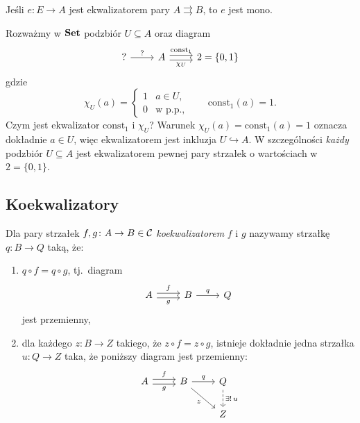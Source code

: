 \begin{stwierdzenie}
Jeśli $e\colon E\to A$ jest ekwalizatorem pary $A\rightrightarrows B$, to $e$ jest mono.
\end{stwierdzenie}

\begin{przyklad}
Rozważmy w $\mathbf{Set}$ podzbiór $U\subseteq A$ oraz diagram
\[\begin{tikzcd}
? \arrow[r,"?"] & A \arrow[r,shift left,"\mathrm{const}_1"] \arrow[r,shift right,swap,"\chi_U"] & 2=\{0,1\}
\end{tikzcd}\]
gdzie
\[
\chi_U(a)=\begin{cases} 1 & a\in U,\\ 0 & \text{w p.p.},\end{cases} \qquad \mathrm{const}_1(a)=1.
\]
Czym jest ekwalizator $\mathrm{const}_1$ i $\chi_U$? Warunek $\chi_U(a) = \mathrm{const}_1(a) = 1$ oznacza dokładnie $a\in U$, więc ekwalizatorem jest inkluzja $U \hookrightarrow A$. W szczególności \emph{każdy} podzbiór $U\subseteq A$ jest ekwalizatorem pewnej pary strzałek o wartościach w $2=\{0,1\}$.
\end{przyklad}

\subsection*{Koekwalizatory}

\begin{definicja}
Dla pary strzałek $f, g \colon A\to B \in \mathcal{C}$ \emph{koekwalizatorem} $f$ i $g$ nazywamy strzałkę $q\colon B\to Q$ taką, że:
\begin{enumerate}
\item $q\circ f = q\circ g$, tj.\ diagram
\[\begin{tikzcd}
A \arrow[r,shift left,"f"] \arrow[r,shift right,swap,"g"] & B \arrow[r,"q"] & Q
\end{tikzcd}\]
jest przemienny,
\item dla każdego $z\colon B\to Z$ takiego, że $z\circ f = z\circ g$, istnieje dokładnie jedna strzałka $u\colon Q\to Z$ taka, że poniższy diagram jest przemienny:
\[\begin{tikzcd}
A \arrow[r,shift left,"f"] \arrow[r,shift right,swap,"g"] & B \arrow[r,"q"] \arrow[dr,swap,"z"] & Q \arrow[d,dashed,"\exists !\, u"] \\
& & Z
\end{tikzcd}\]
\end{enumerate}
\end{definicja}

